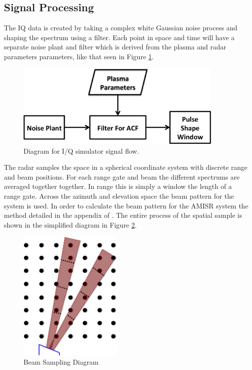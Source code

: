 \documentclass[draft,ras]{agutex}
\begin{document}
\begin{article}
\subsection{Signal Processing}
The IQ data is created by taking a complex white Gaussian noise process and shaping the spectrum using a filter. Each point in space and time will have a separate noise plant and filter which is derived from the plasma and radar parameters parameters, like that seen in Figure \ref{fig:IQdiagram}. 
\begin{figure}[h!]
\centering
\includegraphics[width=4in]{diagrampart}
\caption{Diagram for I/Q simulator signal flow.}
\label{fig:IQdiagram}
\end{figure}

The radar samples the space in a spherical coordinate system with discrete range and beam positions. For each range gate and beam the different spectrums are averaged together together. In range this is simply a window the length of a range gate. Across the azimuth and elevation space the beam pattern for the system is used. In order to calculate the beam pattern for the AMISR system the method detailed in the appendix of \citep{RDS:RDS20236}. The entire process of the spatial sample is shown in the simplified diagram in Figure \ref{fig:beamdia}.


\begin{figure}[!t]
\centering
\includegraphics[width=2in]{beamsampling}
\caption{Beam Sampling Diagram}
\label{fig:beamdia}
\end{figure}


\end{article}
\end{document}

